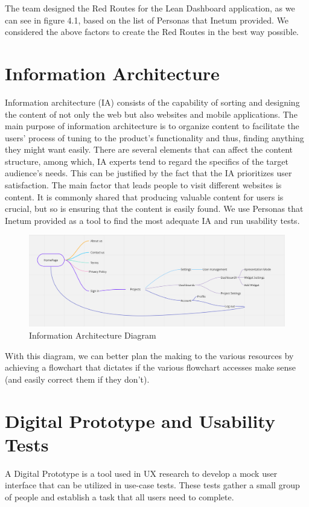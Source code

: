 \documentclass[a4paper,twoside,10pt]{report}
\begin{document}
The team designed the Red Routes for the Lean Dashboard application, as we can see in figure 4.1, based on the list of Personas that Inetum provided. We considered the above factors to create the Red Routes in the best way possible.
\newpage

\section{Information Architecture}
Information architecture (IA) consists of the capability of sorting and designing the content of not only the web but also websites and mobile applications. 
The main purpose of information architecture is to organize content to facilitate the users' process of tuning to the product's functionality and thus, finding anything they might want easily.
There are several elements that can affect the content structure, among which, IA experts tend to regard the specifics of the target audience's needs. This can be justified by the fact that the IA prioritizes user satisfaction.
The main factor that leads people to visit different websites is content. It is commonly shared that producing valuable content for users is crucial, but so is ensuring that the content is easily found. We use Personas that Inetum provided as a tool to find the most adequate IA and run usability tests.
 
\begin{figure}[h!]
\center
  \includegraphics[width=\textwidth]{information-architecture.png}
\caption{Information Architecture Diagram}
\end{figure}

With this diagram, we can better plan the making to the various resources by achieving a flowchart that dictates if the various flowchart accesses make sense (and easily correct them if they don't).

\newpage
\section{Digital Prototype and Usability Tests}
A Digital Prototype is a tool used in UX research to develop a mock user interface that can be utilized in use-case tests. These tests gather a small group of people and establish a task that all users need to complete. 
 
\end{document}
